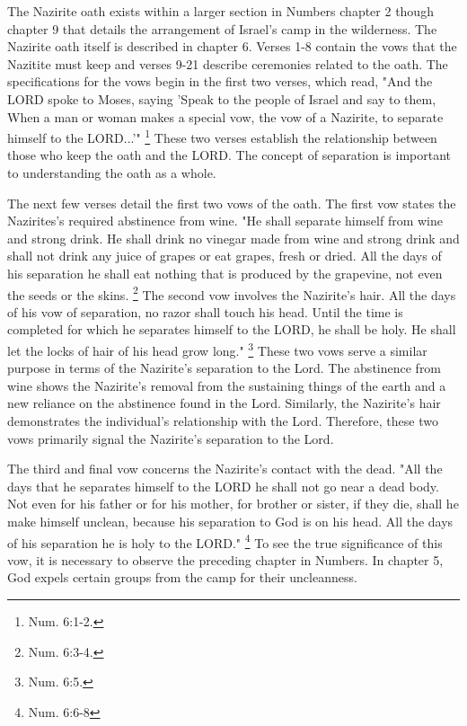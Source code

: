 \documentclass[12pt]{turabian-researchpaper}
\begin{document}
\par
The Nazirite oath exists within a larger section in Numbers chapter 2 though chapter 9 that details the arrangement of Israel's camp in the wilderness.
The Nazirite oath itself is described in chapter 6.
Verses 1-8 contain the vows that the Nazitite must keep and verses 9-21 describe ceremonies related to the oath.
The specifications for the vows begin in the first two verses, which read, "And the LORD spoke to Moses, saying 'Speak to the people of Israel and say to them, When a man or woman makes a special vow, the vow of a Nazirite, to separate himself to the LORD...'"  \footnote{Num. 6:1-2.}
These two verses establish the relationship between those who keep the oath and the LORD.
The concept of separation is important to understanding the oath as a whole.
\par
The next few verses detail the first two vows of the oath.
The first vow states the Nazirites's required abstinence from wine.
"He shall separate himself from wine and strong drink. He shall drink no vinegar made from wine and strong drink and shall not drink any juice of grapes or eat grapes, fresh or dried. All the days of his separation he shall eat nothing that is produced by the grapevine, not even the seeds or the skins. \footnote{Num. 6:3-4.}
The second vow involves the Nazirite's hair. 
All the days of his vow of separation, no razor shall touch his head. Until the time is completed for which he separates himself to the LORD, he shall be holy. He shall let the locks of hair of his head grow long." \footnote{Num. 6:5.} 
These two vows serve a similar purpose in terms of the Nazirite's separation to the Lord.
The abstinence from wine shows the Nazirite's removal from the sustaining things of the earth and a new reliance on the abstinence found in the Lord.
Similarly, the Nazirite's hair demonstrates the individual's relationship with the Lord.
Therefore, these two vows primarily signal the Nazirite's separation to the Lord.
\par
The third and final vow concerns the Nazirite's contact with the dead.
"All the days that he separates himself to the LORD he shall not go near a dead body. Not even for his father or for his mother, for brother or sister, if they die, shall he make himself unclean, because his separation to God is on his head. All the days of his separation he is holy to the LORD." \footnote{Num. 6:6-8}
To see the true significance of this vow, it is necessary to observe the preceding chapter in Numbers. 
In chapter 5, God expels certain groups from the camp for their uncleanness. 
\end{document}

